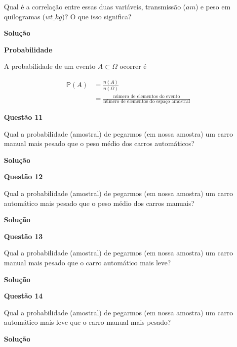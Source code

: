 \documentclass[12pt, a4paper]{article}
\begin{document}
Qual é a correlação entre essas duas variáveis, transmissão ($am$) e peso em quilogramas ($wt\_kg$)? O que isso significa?

\textbf{Solução}




\textbf{Probabilidade}

A probabilidade de um evento $A \subset \Omega$ ocorrer é

\begin{align*}
	\mathbb{P}(A) &= \frac{n(A)}{n(\Omega)}\\
	&= \frac{\text{número de elementos do evento}}{\text{número de elementos do espaço amostral}}
\end{align*}

\textbf{Questão 11}

Qual a probabilidade (amostral) de pegarmos (em nossa amostra) um carro manual mais pesado que o peso médio dos carros automáticos?

\textbf{Solução}





\textbf{Questão 12}

Qual a probabilidade (amostral) de pegarmos (em nossa amostra) um carro automático mais pesado que o peso médio dos carros manuais?

\textbf{Solução}





\textbf{Questão 13}

Qual a probabilidade (amostral) de pegarmos (em nossa amostra) um carro manual mais pesado que o carro automático mais leve?

\textbf{Solução}





\textbf{Questão 14}

Qual a probabilidade (amostral) de pegarmos (em nossa amostra) um carro automático mais leve que o carro manual mais pesado?

\textbf{Solução}




	
\end{document}
